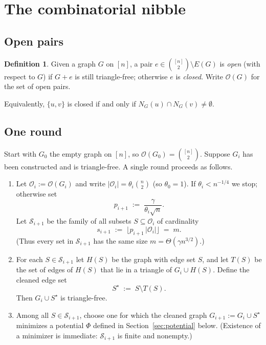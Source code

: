 \documentclass[11pt]{article}
\theoremstyle{definition}
\newtheorem{definition}[theorem]{Definition}
\newcommand{\cO}{\mathcal{O}}
\newcommand{\bin}[2]{\binom{#1}{#2}}
\begin{document}
\section{The combinatorial nibble}

\subsection{Open pairs}

\begin{definition}
Given a graph $G$ on $[n]$, a pair $e\in\bin{[n]}{2}\setminus E(G)$ is \emph{open} (with respect to $G$) if $G+e$ is still triangle-free; otherwise $e$ is \emph{closed}.
Write $\cO(G)$ for the set of open pairs.
\end{definition}

Equivalently, $\{u,v\}$ is closed if and only if $N_G(u)\cap N_G(v)\ne\emptyset$.

\subsection{One round}

Start with $G_0$ the empty graph on $[n]$, so $\cO(G_0)=\bin{[n]}{2}$.
Suppose $G_i$ has been constructed and is triangle-free.
A single round proceeds as follows.

\begin{enumerate}
  \item[\textbf{(Nibble)}]
    Let $\cO_i:=\cO(G_i)$ and write $|\cO_i|=\theta_i\bin{n}{2}$ (so $\theta_0=1$).
    If $\theta_i < n^{-1/4}$ we stop; otherwise set
    \[
      p_{i+1}\;:=\; \frac{\gamma}{\theta_i\sqrt{n}}.
    \]
    Let $\mathcal{S}_{i+1}$ be the family of all subsets $S\subseteq\cO_i$ of cardinality
    \[
      s_{i+1}\;:=\; \bigl\lfloor p_{i+1}\,|\cO_i|\bigr\rfloor \;=\; m.
    \]
    (Thus every set in $\mathcal{S}_{i+1}$ has the same size $m=\Theta(\gamma n^{3/2})$.)

  \item[\textbf{(Clean)}]
    For each $S\in\mathcal{S}_{i+1}$ let $H(S)$ be the graph with edge set $S$, and let $T(S)$ be the set of edges of $H(S)$ that lie in a triangle of $G_i\cup H(S)$.
    Define the cleaned edge set
    \[
      S^\star\;:=\; S\setminus T(S).
    \]
    Then $G_i\cup S^\star$ is triangle-free.

  \item[\textbf{(Select)}]
    Among all $S\in\mathcal{S}_{i+1}$, choose one for which the cleaned graph $G_{i+1}:=G_i\cup S^\star$ minimizes a potential $\Phi$ defined in Section~\ref{sec:potential} below.
    (Existence of a minimizer is immediate: $\mathcal{S}_{i+1}$ is finite and nonempty.)
\end{enumerate}
\end{document}
